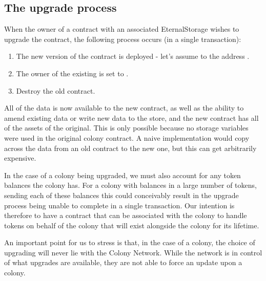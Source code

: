 \subsection{The upgrade process}

When the owner of a contract with an associated EternalStorage wishes to upgrade the contract, the following process occurs (in a single transaction):

\begin{enumerate}
\item The new version of the contract is deployed - let's assume to the address .
\item The owner of the existing  is set to .
\item Destroy the old contract.
\end{enumerate}

All of the data is now available to the new contract, as well as the ability to amend existing data or write new data to the store, and the new contract has all of the assets of the original. This is only possible because no storage variables were used in the original colony contract. A naive implementation would copy across the data from an old contract to the new one, but this can get arbitrarily expensive.

In the case of a colony being upgraded, we must also account for any token balances the colony has. For a colony with balances in a large number of tokens, sending each of these balances this could conceivably result in the upgrade process being unable to complete in a single transaction. Our intention is therefore to have a contract that can be associated with the colony to handle tokens on behalf of the colony that will exist alongside the colony for its lifetime.

An important point for us to stress is that, in the case of a colony, the choice of upgrading will never lie with the Colony Network. While the network is in control of what upgrades are available, they are not able to force an update upon a colony.